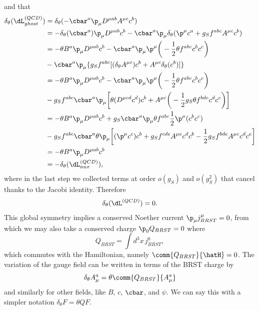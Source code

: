 and that 
\begin{equation}
    \begin{split}
        \delta_\theta(\dL^{(QCD)}_{ghost}) &= \delta_\theta(-\cbar^a\p_\mu D^{\mu ab}A^{\mu c}c^b) \\
        &= -\delta_\theta(\cbar^a)\p_\mu D^{\mu ab}c^b - \cbar^a\p_\mu\delta_\theta(\p^\mu c^a + g_Sf^{abc}A^{\mu c}c^b) \\
        &= -\theta B^a\p_\mu D^{\mu ab}c^b - \cbar^a\p_\mu\p^\mu\bigg(-\frac{1}{2}\theta f^{abc}c^bc^c\bigg) \\
        &-\cbar^a\p_\mu\{g_Sf^{abc}[(\delta_\theta A^{\mu c})c^b + A^{\mu c}\delta_\theta(c^b)]\} \\
        &= -\theta B^a\p_\mu D^{\mu ab}c^b - \cbar^a\p_\mu \p^\mu\bigg(-\frac{1}{2}\theta f^{abc}c^bc^c\bigg) \\
        &-g_Sf^{abc}\cbar^a\p_\mu\bigg[\theta(D^{\mu cd}c^d)c^b + A^{\mu c}\bigg(-\frac{1}{2}g_S\theta f^{bde}c^dc^e\bigg)\bigg] \\
        &= -\theta B^a\p_\mu D^{\mu ab}c^b + g_S\cbar^a\p_\mu \theta f^{abc}\frac{1}{2}\p^\mu(c^bc^c) \\
        &- g_Sf^{abc}\cbar^a\theta\p_\mu\bigg[(\p^\mu c^c)c^b + g_Sf^{cde}A^{\mu e}c^dc^b - \frac{1}{2}g_Sf^{bde}A^{\mu c}c^dc^e\bigg] \\
        &= -\theta B^a \p_\mu D^{\mu ab}c^b \\
        &= -\delta_\theta(\dL^{(QCD)}_{aux}),
    \end{split}
\end{equation}
where in the last step we collected terms at order $o(g_S)$ and $o(g_S^2)$ that cancel thanks to the Jacobi identity. Therefore
\begin{equation}
    \delta_\theta(\dL^{(QCD)}) = 0.
\end{equation}
This global symmetry implies a conserved Noether current $\p_\mu j^\mu_{BRST} = 0$, from which we may also take a conserved charge $\p_0Q_{BRST} = 0$ where
\begin{equation}
    Q_{BRST} = \int d^3x\,j^0_{BRST},
\end{equation}
which commutes with the Hamiltonian, namely $\comm{Q_{BRST}}{\hatH} = 0$. The variation of the gauge field can be written in terms of the BRST charge by
\begin{equation}
    \delta_\theta A^a_\mu = \theta\comm{Q_{BRST}}{A^a_\mu}
\end{equation}
and similarly for other fields, like $B$, $c$, $\cbar$, and $\psi$. We can say this with a simpler notation $\delta_\theta F = \theta QF$.

